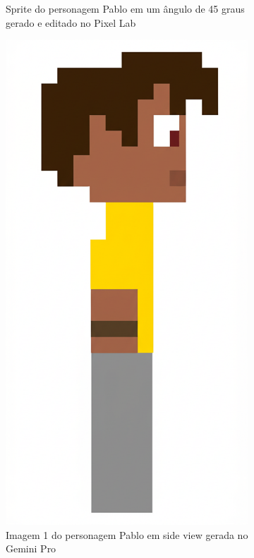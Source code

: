 \begin{figure}[htbp]
\begin{subfigure}{0.32\linewidth}
        \caption{\small Sprite do personagem Pablo em um ângulo de 45 graus gerado e editado no Pixel Lab}
        \label{fig:chatGPTPablo45}
    \end{subfigure}
    \begin{subfigure}{0.32\linewidth}
        \includegraphics[width=0.7\linewidth]{figs/geminiPro/melhores/chat2_1.png}
        \caption{\small Imagem 1 do personagem Pablo em side view gerada no Gemini Pro}
        \label{fig:chatGPTPabloGeminiPro1}
    \end{subfigure}
    \begin{subfigure}{0.32\linewidth}

\end{subfigure}
\end{figure}
